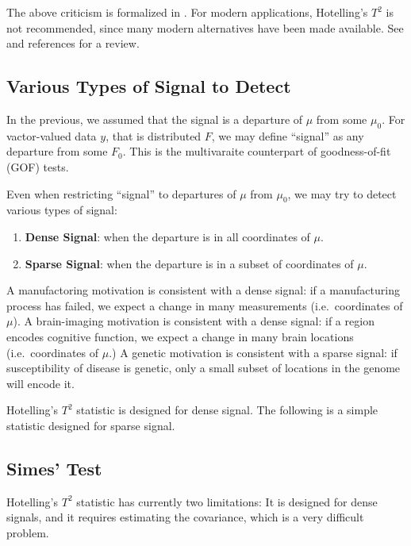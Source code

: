 \documentclass[]{book}
\providecommand{\tightlist}{%
  \setlength{\itemsep}{0pt}\setlength{\parskip}{0pt}}
\theoremstyle{definition}
\theoremstyle{definition}
\theoremstyle{definition}
\theoremstyle{remark}
\begin{document}
The above criticism is formalized in \citet{bai1996effect}.
For modern applications, Hotelling's \(T^2\) is not recommended, since many modern alternatives have been made available. See \citet{rosenblatt2016better} and references for a review.

\hypertarget{various-types-of-signal-to-detect}{%
\subsection{Various Types of Signal to Detect}\label{various-types-of-signal-to-detect}}

In the previous, we assumed that the signal is a departure of \(\mu\) from some \(\mu_0\).
For vactor-valued data \(y\), that is distributed \(F\), we may define ``signal'' as any departure from some \(F_0\).
This is the multivaraite counterpart of goodness-of-fit (GOF) tests.

Even when restricting ``signal'' to departures of \(\mu\) from \(\mu_0\), we may try to detect various types of signal:

\begin{enumerate}
\def\labelenumi{\arabic{enumi}.}
\tightlist
\item
  \textbf{Dense Signal}: when the departure is in all coordinates of \(\mu\).
\item
  \textbf{Sparse Signal}: when the departure is in a subset of coordinates of \(\mu\).
\end{enumerate}

A manufactoring motivation is consistent with a dense signal: if a manufacturing process has failed, we expect a change in many measurements (i.e.~coordinates of \(\mu\)).
A brain-imaging motivation is consistent with a dense signal: if a region encodes cognitive function, we expect a change in many brain locations (i.e.~coordinates of \(\mu\).)
A genetic motivation is consistent with a sparse signal: if susceptibility of disease is genetic, only a small subset of locations in the genome will encode it.

Hotelling's \(T^2\) statistic is designed for dense signal.
The following is a simple statistic designed for sparse signal.

\hypertarget{simes-test}{%
\subsection{Simes' Test}\label{simes-test}}

Hotelling's \(T^2\) statistic has currently two limitations: It is designed for dense signals, and it requires estimating the covariance, which is a very difficult problem.
\end{document}

